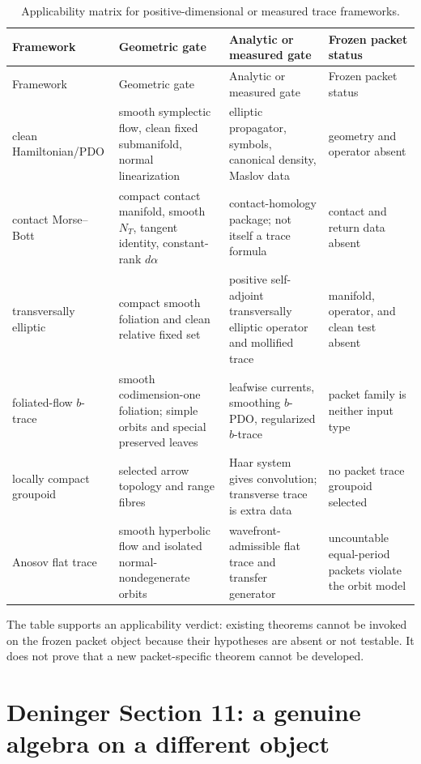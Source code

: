 \documentclass[11pt]{article}
\theoremstyle{definition}
\theoremstyle{remark}
\begin{document}
\begin{longtable}{p{}p{}p{}p{}}
\caption{Applicability matrix for positive-dimensional or measured trace
frameworks.}\label{tab:frameworks}\\
\toprule
Framework & Geometric gate & Analytic or measured gate & Frozen packet status\\
\midrule
\endfirsthead
\toprule
Framework & Geometric gate & Analytic or measured gate & Frozen packet status\\
\midrule
\endhead
clean Hamiltonian/PDO & smooth symplectic flow, clean fixed submanifold, normal linearization & elliptic propagator, symbols, canonical density, Maslov data & geometry and operator absent\\
contact Morse--Bott & compact contact manifold, smooth \(N_T\), tangent identity, constant-rank \(d\alpha\) & contact-homology package; not itself a trace formula & contact and return data absent\\
transversally elliptic & compact smooth foliation and clean relative fixed set & positive self-adjoint transversally elliptic operator and mollified trace & manifold, operator, and clean test absent\\
foliated-flow \(b\)-trace & smooth codimension-one foliation; simple orbits and special preserved leaves & leafwise currents, smoothing \(b\)-PDO, regularized \(b\)-trace & packet family is neither input type\\
locally compact groupoid & selected arrow topology and range fibres & Haar system gives convolution; transverse trace is extra data & no packet trace groupoid selected\\
Anosov flat trace & smooth hyperbolic flow and isolated normal-nondegenerate orbits & wavefront-admissible flat trace and transfer generator & uncountable equal-period packets violate the orbit model\\
\bottomrule
\end{longtable}

The table supports an applicability verdict: existing theorems cannot be
invoked on the frozen packet object because their hypotheses are absent or
not testable.  It does not prove that a new packet-specific theorem cannot be
developed.

\section{Deninger Section 11: a genuine algebra on a different object}
\label{sec:section11}
\end{document}

